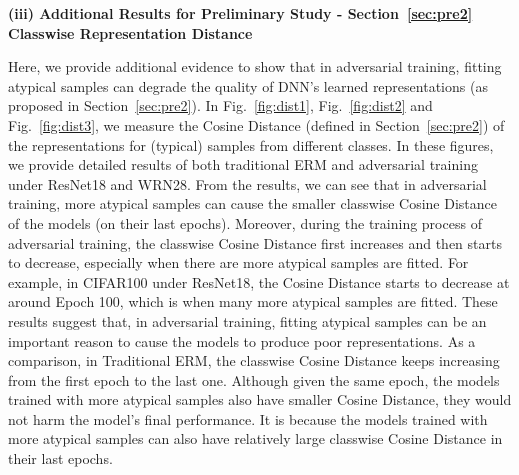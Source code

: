 \vspace{2cm}
\textbf{(iii) Additional Results for Preliminary Study - Section~\ref{sec:pre2} Classwise Representation Distance}

Here, we provide additional evidence to show that in adversarial training, fitting atypical samples can degrade the quality of DNN's learned representations (as proposed in Section~\ref{sec:pre2}). In Fig.~\ref{fig:dist1}, Fig.~\ref{fig:dist2} and Fig.~\ref{fig:dist3}, we measure the Cosine Distance (defined in Section~\ref{sec:pre2}) of the representations for (typical) samples from different classes. In these figures, we provide detailed results of both traditional ERM and adversarial training under ResNet18 and WRN28. From the results, we can see that in adversarial training, more atypical samples can cause the smaller classwise Cosine Distance of the models (on their last epochs). Moreover, during the training process of adversarial training, the classwise Cosine Distance first increases and then starts to decrease, especially when there are more atypical samples are fitted. For example, in CIFAR100 under ResNet18, the Cosine Distance starts to decrease at around Epoch 100, which is when many more atypical samples are fitted. These results suggest that, in adversarial training, fitting atypical samples can be an important reason to cause the models to produce poor representations. As a comparison, in Traditional ERM, the classwise Cosine Distance keeps increasing from the first epoch to the last one. Although given the same epoch, the models trained with more atypical samples also have smaller Cosine Distance, they would not harm the model's final performance. It is because the models trained with more atypical samples can also have relatively large classwise Cosine Distance in their last epochs.


